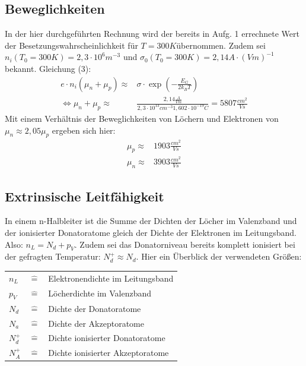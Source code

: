 \subsection{Beweglichkeiten}
In der hier durchgeführten Rechnung wird der bereits in Aufg. 1 errechnete Wert der Besetzungswahrscheinlichkeit für \(T=300\si{K}\)übernommen. Zudem sei \(n_i(T_0=300\si{K})=2,3\cdot 10^{6}\si{m^{-3}}\) und \(\sigma_0(T_0=300\si{K})=2,14\si{A\cdot(Vm)^{-1}}\) bekannt. Gleichung (3):
\begin{align*}
e\cdot n_i (\mu_n+\mu_p)\approx & \sigma \cdot \exp(-\frac{E_G}{2 k_B T}) \\
\Leftrightarrow \mu_n+\mu_p \approx & \frac{2,14\si{\frac{A}{V m}}}{2,3\cdot 10^{13}\si{cm^{-3}}1,602\cdot10^{-19}\si{C}} = 5807 \si{\frac{cm^2}{V s}}
\end{align*}
Mit einem Verhältnis der Beweglichkeiten von Löchern und Elektronen von \(\mu_n \approx 2,05 \mu_p\) ergeben sich hier:
\begin{align*}
\mu_p\approx & 1903 \si{\frac{cm^2}{V s}} \\
\mu_n\approx & 3903 \si{\frac{cm^2}{V s}}
\end{align*}

\subsection{Extrinsische Leitfähigkeit}
In einem n-Halbleiter ist die Summe der Dichten der Löcher im Valenzband und der ionisierter Donatoratome gleich der Dichte der Elektronen im Leitungsband. Also: \(n_L = N_d + p_V\). Zudem sei das Donatorniveau bereits komplett ionisiert bei der gefragten Temperatur: \(N_d^+ \approx N_d\). Hier ein Überblick der verwendeten Größen:
\begin{table}[H]
\centering
\begin{tabular}{lcl}
\(n_L\) & \(\widehat{=}\) & Elektronendichte im Leitungsband\\
\(p_V\) & \(\widehat{=}\) & Löcherdichte im Valenzband\\
\(N_d\) & \(\widehat{=}\) & Dichte der Donatoratome\\
\(N_a\) & \(\widehat{=}\) & Dichte der Akzeptoratome\\
\(N_d^+\) & \(\widehat{=}\) & Dichte ionisierter Donatoratome\\
\(N_A^+\) & \(\widehat{=}\) & Dichte ionisierter Akzeptoratome\\
\end{tabular}
\end{table}

